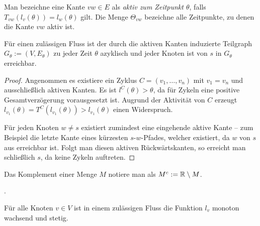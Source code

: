 \begin{definition}
	Man bezeichne eine Kante $vw\in E$ als \emph{aktiv zum Zeitpunkt $\theta$}, falls $T_{vw}(l_v(\theta)) = l_w(\theta)$ gilt.
	Die Menge $\Theta_{vw}$ bezeichne alle Zeitpunkte, zu denen die Kante $vw$ aktiv ist.
\end{definition}

\begin{lemma}\label{lemma-shortest-path-using-active-edges}
	Für einen zulässigen Fluss ist der durch die aktiven Kanten induzierte Teilgraph $G_\theta:=(V, E_\theta)$ zu jeder Zeit $\theta$ azyklisch und jeder Knoten ist von $s$ in $G_\theta$ erreichbar.
\end{lemma}
\begin{proof}
	Angenommen es existiere ein Zyklus $C=(v_1, \dots, v_n)$ mit $v_1=v_n$ und ausschließlich aktiven Kanten.
	Es ist $l^C(\theta) > \theta$, da für Zykeln eine positive Gesamtverzögerung vorausgesetzt ist.
	Augrund der Aktivität von $C$ erzeugt $l_{v_1}(\theta) = T^C(l_{v_1}(\theta)) > l_{v_1}(\theta)$ einen Widerspruch.
	
	Für jeden Knoten $w\neq s$ existiert zumindest eine eingehende aktive Kante -- zum Beispiel die letzte Kante eines kürzesten $s$-$w$-Pfades, welcher existiert, da $w$ von $s$ aus erreichbar ist.
	Folgt man diesen aktiven Rückwärtskanten, so erreicht man schließlich $s$, da keine Zykeln auftreten.
\end{proof}

\begin{notation}
	Das Komplement einer Menge $M$ notiere man als $M^c:= \mathbb{R}\setminus M$.
\end{notation}

.

\begin{lemma}
	Für alle Knoten $v\in V$ ist in einem zulässigen Fluss die Funktion $l_v$ monoton wachsend und stetig.
\end{lemma}

